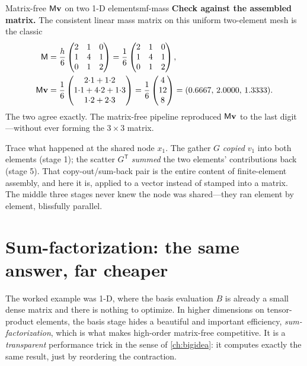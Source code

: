 \begin{workedexample}{Matrix-free $\mathsf{M}\mathbf{v}$ on two 1-D elements}{mf-mass}
\textbf{Check against the assembled matrix.} The consistent linear mass matrix on
this uniform two-element mesh is the classic
\[
  \begin{aligned}
  \mathsf{M}&=\frac{h}{6}\begin{pmatrix}2&1&0\\1&4&1\\0&1&2\end{pmatrix}
        =\frac16\begin{pmatrix}2&1&0\\1&4&1\\0&1&2\end{pmatrix}, \\
  \mathsf{M}\mathbf{v}&=\frac16\begin{pmatrix}2{\cdot}1+1{\cdot}2\\1{\cdot}1+4{\cdot}2+1{\cdot}3\\1{\cdot}2+2{\cdot}3\end{pmatrix}
            =\frac16\begin{pmatrix}4\\12\\8\end{pmatrix}
            =(0.6667,\,2.0000,\,1.3333).
  \end{aligned}
\]
The two agree exactly. The matrix-free pipeline reproduced $\mathsf{M}\mathbf{v}$ to the
last digit---without ever forming the $3\times3$ matrix.
\end{workedexample}

\begin{remark}
Trace what happened at the shared node $x_1$. The gather $G$ \emph{copied} $v_1$
into both elements (stage 1); the scatter $G^{\mathsf T}$ \emph{summed} the two
elements' contributions back (stage 5). That copy-out/sum-back pair is the entire
content of finite-element assembly, and here it is, applied to a vector instead
of stamped into a matrix. The middle three stages never knew the node was
shared---they ran element by element, blissfully parallel.
\end{remark}

\section{Sum-factorization: the same answer, far cheaper}
\label{sec:mf-sumfac}

The worked example was 1-D, where the basis evaluation $B$ is already a small
dense matrix and there is nothing to optimize. In higher dimensions on
tensor-product elements, the basis stage hides a beautiful and important
efficiency, \emph{sum-factorization}, which is what makes high-order
matrix-free competitive. It is a \emph{transparent} performance trick in the
sense of \cref{ch:bigidea}: it computes exactly the same result, just by
reordering the contraction.

